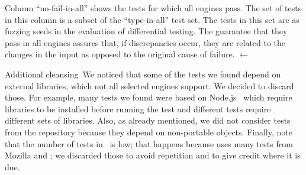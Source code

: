 \documentclass[smallextended]{svjour3}
\begin{document}
Column ``no-fail-in-all'' shows the tests for which all engines
pass. The set of tests in this column is a subset of the
``type-in-all'' test set. The tests in this set are as fuzzing seeds
in the evaluation of differential testing. The guarantee that they
pass in all engines assures that, if discrepancies occur, they are
related to the changes in the input as opposed to the original cause
of failure.
$\leftarrow$




\lbrack{}Additional cleansing\rbrack{}~We noticed that some of the
tests we found depend on external libraries, which not all selected
engines support. We decided to discard those. For example, many tests
we found were based on Node.js~\cite{node} which
require libraries to be
installed before running the test and different tests require
different sets of libraries. Also, as already mentioned, we did not
consider tests from the \chakra{} repository because they depend on
non-portable objects.  Finally, note that the number of tests in
\veight\ is low; that happens because \veight{} uses many tests from
Mozilla and \jsc; we discarded those to avoid repetition and to give
credit where it is due.
\end{document}
